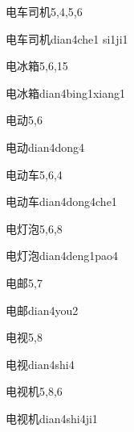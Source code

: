 \begin{entry}{电车司机}{5,4,5,6}
  \begin{phonetics}{电车司机}{dian4che1 si1ji1}
  \end{phonetics}
\end{entry}

\begin{entry}{电冰箱}{5,6,15}
  \begin{phonetics}{电冰箱}{dian4bing1xiang1}
  \end{phonetics}
\end{entry}

\begin{entry}{电动}{5,6}
  \begin{phonetics}{电动}{dian4dong4}
  \end{phonetics}
\end{entry}

\begin{entry}{电动车}{5,6,4}
  \begin{phonetics}{电动车}{dian4dong4che1}
  \end{phonetics}
\end{entry}

\begin{entry}{电灯泡}{5,6,8}
  \begin{phonetics}{电灯泡}{dian4deng1pao4}
  \end{phonetics}
\end{entry}

\begin{entry}{电邮}{5,7}
  \begin{phonetics}{电邮}{dian4you2}
  \end{phonetics}
\end{entry}

\begin{entry}{电视}{5,8}
  \begin{phonetics}{电视}{dian4shi4}
  \end{phonetics}
\end{entry}

\begin{entry}{电视机}{5,8,6}
  \begin{phonetics}{电视机}{dian4shi4ji1}
  \end{phonetics}
\end{entry}

